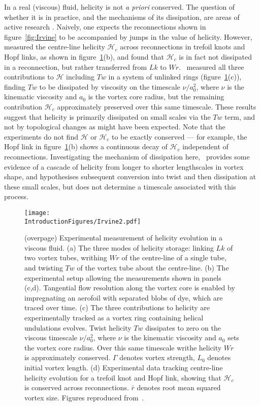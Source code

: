 In a real (viscous) fluid, helicity is not \emph{a priori} conserved. The question of whether it is in practice, and the mechanisms of its dissipation, are areas of active research \citep{Kleckner2013, Scheeler2014,Scheeler2016}. Naively, one expects the reconnections shown in figure~\ref{fig:Irvine} to be accompanied by jumps in the value of helicity. However,~\citep{Scheeler2014} measured the centre-line helicity $\mathcal{H}_c$ across reconnections in trefoil knots and Hopf links, as shown in figure~\ref{fig:Irvine2}(b), and found that $\mathcal{H}_c$ is in fact not dissipated in a reconnection, but rather transferred from $Lk$ to $Wr$.~\citep{Scheeler2016} measured all three contributions to $\mathcal{H}$ including $Tw$ in a system of unlinked rings (figure~\ref{fig:Irvine2}(c)), finding $Tw$ to be dissipated by viscosity on the timescale ${\nu}/{a_0^2}$, where $\nu$ is the kinematic viscosity and $a_0$ is the vortex core radius, but the remaining contribution $\mathcal{H}_c$ approximately preserved over this same timescale. These results suggest that helicity is primarily dissipated on small scales via the $Tw$ term, and not by topological changes as might have been expected. Note that the experiments do not find $\mathcal{H}$ or $\mathcal{H}_c$ to be exactly conserved --- for example, the Hopf link in figure~\ref{fig:Irvine2}(b) shows a continuous decay of $\mathcal{H}_c$ independent of reconnections. Investigating the mechanism of dissipation here,~\citep{Scheeler2014} provides some evidence of a cascade of helicity from longer to shorter lengthscales in vortex shape, and hypothesises subsequent conversion into twist and then dissipation at these small scales, but does not determine a timescale associated with this process. 
\begin{figure}[htbp]
\centering
\texttt{[image: \\IntroductionFigures/Irvine2.pdf]}
\end{figure}
\begin{figure}[htbp]
\centering
    \caption[Helicity in a viscous fluid.]{(overpage) Experimental measurement of helicity evolution in a viscous fluid. (a) The three modes of helicity storage: linking $Lk$ of two vortex tubes, writhing $Wr$ of the centre-line of a single tube, and twisting $Tw$ of the vortex tube about the centre-line. (b) The experimental setup allowing the measurements shown in panels (c,d). Tangential flow resolution along the vortex core is enabled by impregnating an aerofoil with separated blobs of dye, which are traced over time. (c) The three contributions to helicity are experimentally tracked as a vortex ring containing helical undulations evolves. Twist helicity $Tw$ dissipates to zero on the viscous timescale ${\nu}/{a_0^2}$, where $\nu$ is the kinematic viscosity and $a_0$ sets the vortex core radius. Over this same timescale writhe helicity $Wr$ is approximately conserved. $\Gamma$ denotes vortex strength, $L_0$ denotes initial vortex length. (d) Experimental data tracking centre-line helicity evolution for a trefoil knot and Hopf link, showing that $\mathcal{H}_c$ is conserved across reconnections. $\bar{r}$ denotes root mean squared vortex size. Figures reproduced from~\citep{Scheeler2014, Scheeler2016}.}
\label{fig:Irvine2}
\end{figure}

